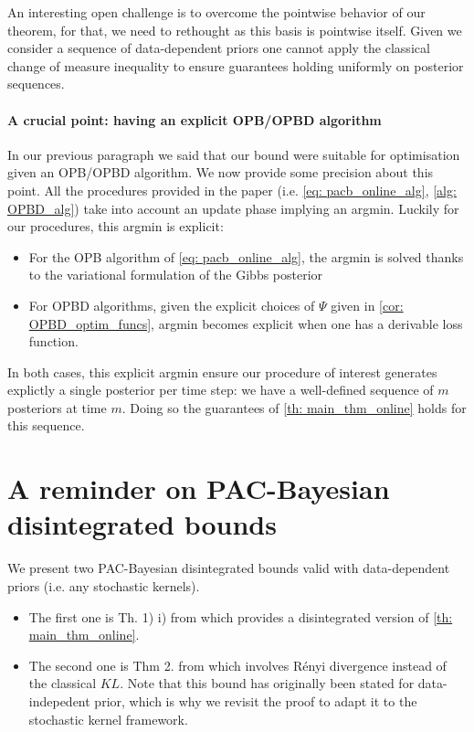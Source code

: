 \begin{noaddcontents}
An interesting open challenge is to overcome the pointwise behavior of our theorem, for that, we need to rethought \cite[Thm 2.1]{rivasplata2020pac} as this basis is pointwise itself. Given we consider a sequence of data-dependent priors one cannot apply the classical change of measure inequality to ensure guarantees holding uniformly on posterior sequences.

\paragraph{A crucial point: having an explicit OPB/OPBD algorithm}

In our previous paragraph we said that our bound were suitable for optimisation given an OPB/OPBD algorithm. We now provide some precision about this point. All the procedures provided in the paper (i.e. \cref{eq: pacb_online_alg}, \cref{alg: OPBD_alg}) take into account an update phase implying an argmin. Luckily for our procedures, this argmin is explicit:
\begin{itemize}
  \item For the OPB algorithm of \cref{eq: pacb_online_alg}, the argmin is solved thanks to the variational formulation of the Gibbs posterior
  \item For OPBD algorithms, given the explicit choices of $\Psi$ given in \cref{cor: OPBD_optim_funcs}, argmin becomes explicit when one has a derivable loss function.
\end{itemize}

In both cases, this explicit argmin ensure our procedure of interest generates explictly a single posterior per time step: we have a well-defined sequence of $m$ posteriors at time $m$.
Doing so the guarantees of \cref{th: main_thm_online} holds for this sequence.


\section{A reminder on PAC-Bayesian disintegrated bounds}
\label{sec: disintegrated_bounds}

We present two PAC-Bayesian disintegrated bounds valid with data-dependent priors (i.e. any stochastic kernels).
\begin{itemize}
  \item The first one is Th. 1) i) from \cite{rivasplata2020pac} which provides a disintegrated version of \cref{th: main_thm_online}.  
  \item The second one is Thm 2. from \cite{viallard2023general} which involves Rényi divergence instead of the classical $KL$. Note that this bound has originally been stated for data-indepedent prior, which is why we revisit the proof to adapt it to the stochastic kernel framework.
\end{itemize}



\end{noaddcontents}
